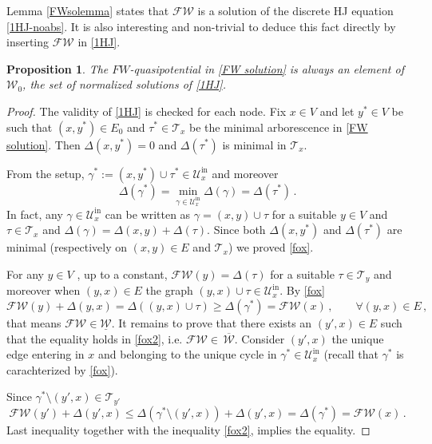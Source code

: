 \documentclass[reqno]{amsart}
\theoremstyle{plain}
\newtheorem{proposition}[theorem]{Proposition}
\theoremstyle{definition}
\theoremstyle{remark}
\numberwithin{equation}{section}
\numberwithin{theorem}{section}
\newcommand{\upbar}[1]{\,\overline{\! #1}}
\newcommand{\<}{\langle}
\renewcommand{\>}{\rangle}
\begin{document}
Lemma \ref{FWsolemma} states that $\mathscr{FW}$ is a solution of the discrete HJ equation \eqref{1HJ-noabs}. It is also interesting and non-trivial to deduce this fact directly by inserting $\mathscr{FW}$ in \eqref{1HJ}.
\begin{proposition}\label{propFW}
	The $FW$-quasipotential in \eqref{FW solution} is always an element of $\mathcal W_0$, the set of normalized solutions of \eqref{1HJ}.
\end{proposition}
\begin{proof}
	The validity of \eqref{1HJ} is checked for each node. Fix $x\in V$ and let $y^*\in V$ be such that $(x,y^*)\in E_0$ and $\tau^*\in \mathcal T_x$ be the minimal arborescence in \eqref{FW solution}. Then $\Delta(x,y^*)=0$ and $\Delta(\tau^*)$ is minimal in $\mathcal T_x$. 
	
	From the setup,  $\gamma^*:=(x,y^*)\cup \tau^* \in  \mathcal{U}^{\mathrm{in}}_x$ and moreover 
	\begin{equation}\label{fox}
		\Delta(\gamma^*)=\min_{\gamma\in \mathcal{U}^{\mathrm{in}}_x} \Delta(\gamma)=\Delta(\tau^*)\,.
	\end{equation} 
	In fact,  any $\gamma\in \mathcal{U}^{\mathrm{in}}_x$ can be written as $\gamma=(x,y)\cup \tau$ for a suitable $y\in V$ and $\tau\in \mathcal T_x$ and $\Delta(\gamma)=\Delta(x,y)+\Delta (\tau)$. Since both $\Delta(x,y^*)$ and $\Delta (\tau^*)$ are minimal (respectively on $(x,y)\in E$ and $\mathcal T_x$) we  proved \eqref{fox}.
	
	For any $y\in V$ , up to a constant, $\mathscr{FW}(y)=\Delta(\tau)$ for a suitable $\tau\in \mathcal T_y$ and moreover when $(y,x)\in E$ the graph $(y,x)\cup \tau\in \mathcal{U}^{\mathrm{in}}_x$. By \eqref{fox} 
	\begin{equation}\label{fox2}
		\mathscr{FW}(y)+\Delta(y,x)=\Delta((y,x)\cup \tau)\geq \Delta(\gamma^*)=\mathscr{FW}(x)\,,\qquad \forall (y,x)\in E\,,
	\end{equation}
	that means $\mathscr{FW}\in \underline{\mathcal W}$.
	It remains to prove that there exists an $(y',x)\in E$ such that the equality holds in \eqref{fox2}, i.e. $\mathscr{FW}\in \upbar{\mathcal W}$. Consider $(y',x)$ the unique edge entering in $x$ and belonging to the unique cycle in
	$\gamma^*\in \mathcal{U}^{\mathrm{in}}_x$ (recall that $\gamma^*$ is carachterized by \eqref{fox}). 
	
	Since $\gamma^*\setminus (y',x)\in \mathcal T_{y'}$
	\begin{equation}
		\mathscr{FW}(y')+\Delta(y',x)\leq \Delta(\gamma^*\setminus (y',x))+\Delta(y',x)=\Delta(\gamma^*)=\mathscr{FW}(x)\,.
	\end{equation}
	Last inequality  together with the inequality \eqref{fox2}, implies the equality.
\end{proof}
\end{document}
